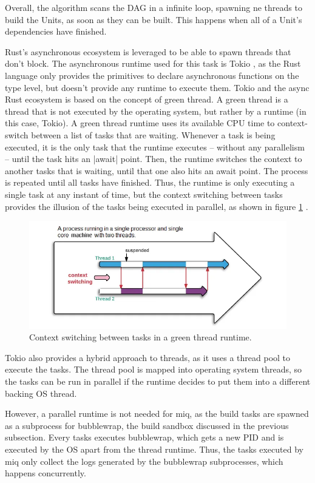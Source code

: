 Overall, the algorithm scans the \ac{DAG} in a infinite
loop, spawning ne threads to build the Units, as soon as
they can be built. This happens when all of a Unit's
dependencies have finished.

Rust's asynchronous ecosystem is leveraged to be able to
spawn threads that don't block. The asynchronous runtime
used for this task is Tokio \cite{TokioRust}, as the Rust
language only provides the primitives to declare
asynchronous functions on the type level, but doesn't
provide any runtime to execute them. Tokio and the async
Rust ecosystem is based on the concept of green thread. A
green thread is a thread that is not executed by the
operating system, but rather by a runtime (in this case,
Tokio). A green thread runtime uses its available CPU time
to context-switch between a list of tasks that are waiting.
Whenever a task is being executed, it is the only task that
the runtime executes -- without any parallelism -- until the
task hits an |await| point. Then, the runtime switches the
context to another tasks that is waiting, until that one
also hits an await point. The process is repeated until all
tasks have finished. Thus, the runtime is only executing a
single task at any instant of time, but the context
switching between tasks provides the illusion of the tasks
being executed in parallel, as shown in figure \ref{fig:timeshare} .

\begin{figure}[hbt]
    \centerfloat
    \includegraphics[width=350pt]{assets/timeshare.png}
    \caption{Context switching between tasks in a green thread runtime.}
    \label{fig:timeshare}
\end{figure}

Tokio also provides a hybrid approach to threads, as it uses
a thread pool to execute the tasks. The thread pool is
mapped into operating system threads, so the tasks can be
run in parallel if the runtime decides to put them into a
different backing \ac{OS} thread.

However, a parallel runtime is not needed for miq, as the
build tasks are spawned as a subprocess for bubblewrap, the
build sandbox discussed in the previous subsection. Every
tasks executes bubblewrap, which gets a new \acl{PID} and is
executed by the OS apart from the thread runtime. Thus, the
tasks executed by miq only collect the logs generated by the
bubblewrap subprocesses, which happens concurrently.

